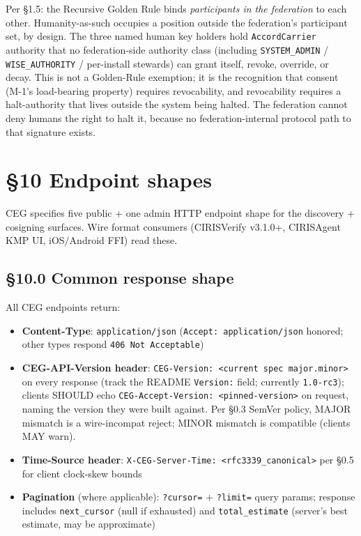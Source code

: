 \documentclass[10pt]{article}
\begin{document}
Per §1.5: the Recursive Golden Rule binds \textit{participants in the federation} to each other. Humanity-as-such occupies a position outside the federation's participant set, by design. The three named human key holders hold \texttt{AccordCarrier} authority that no federation-side authority class (including \texttt{SYSTEM\_ADMIN} / \texttt{WISE\_AUTHORITY} / per-install stewards) can grant itself, revoke, override, or decay. This is not a Golden-Rule exemption; it is the recognition that consent (M-1's load-bearing property) requires revocability, and revocability requires a halt-authority that lives outside the system being halted. The federation cannot deny humans the right to halt it, because no federation-internal protocol path to that signature exists.




\clearpage


\section*{§10 Endpoint shapes}


CEG specifies five public + one admin HTTP endpoint shape for the discovery + cosigning surfaces. Wire format consumers (CIRISVerify v3.1.0+, CIRISAgent KMP UI, iOS/Android FFI) read these.


\subsection*{§10.0 Common response shape}


All CEG endpoints return:


\begin{itemize}\setlength\itemsep{0pt}
\item \textbf{Content-Type}: \texttt{application/json} (\texttt{Accept: application/json} honored; other types respond \texttt{406 Not Acceptable})
\item \textbf{CEG-API-Version header}: \texttt{CEG-Version: <current spec major.minor>} on every response (track the README \texttt{Version:} field; currently \texttt{1.0-rc3}); clients SHOULD echo \texttt{CEG-Accept-Version: <pinned-version>} on request, naming the version they were built against. Per §0.3 SemVer policy, MAJOR mismatch is a wire-incompat reject; MINOR mismatch is compatible (clients MAY warn).
\item \textbf{Time-Source header}: \texttt{X-CEG-Server-Time: <rfc3339\_canonical>} per §0.5 for client clock-skew bounds
\item \textbf{Pagination} (where applicable): \texttt{?cursor=} + \texttt{?limit=} query params; response includes \texttt{next\_cursor} (null if exhausted) and \texttt{total\_estimate} (server's best estimate, may be approximate)
\end{itemize}
\end{document}
